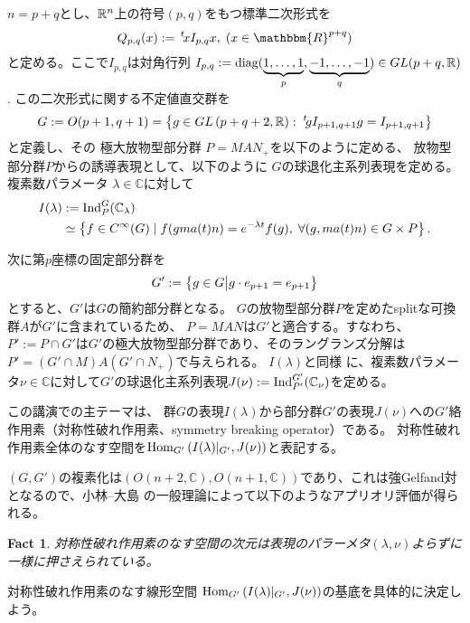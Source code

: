 \documentclass[12pt]{article} %
\newcommand{\assign}{:=}
\newcommand{\tmop}[1]{\ensuremath{\operatorname{#1}}}
\newcommand{\Hom}{\mbox{\normalfont Hom}}
\newcommand{\Ind}{\mbox{\normalfont Ind}}
\newtheorem{fact}[theorem]{Fact}
\theoremstyle{definition}
\theoremstyle{exampstyle} \newtheorem{examp}[theorem]{Theorem}
\renewcommand{\Q}{Q_{p,q}}
\newcommand{\IlambdaGprime}{I(\lambda)\kern-0.3em\mid_{G'}}
\newcommand{\SBO}{\Hom_{G'}\left(\IlambdaGprime,J(\nu) \right)}
\begin{document}
  \begin{versiona}
	  $n=p+q$と{し}、$\mathbb{R}^n$上の符号$(p,q)$をもつ標準二次形式を
	  \begin{equation*}
  \Q (x) \assign \,^t \! x I_{p, q} x, \; (x \in
  \mathbbm{R}^{p + q})
	  \end{equation*}
	  と定める。ここで$I_{p,q}$は対角行列
   $I_{p, q} \assign \tmop{diag} (\underbrace{1, \ldots, 1}_p, \underbrace{-
  1, \ldots, - 1}_q)\in GL(p+q,\R)$.
この二次形式に{関する}不定値直交群を
\begin{equation*}
	G \assign O (p +
1, q + 1)=\left\{ g\in GL\left( p+q+2,\R \right):\;^t\!gI_{p+1,q+1}g=I_{p+1,q+1} \right\}
\end{equation*}
と定義し、その
極大放物型部分群
$P=MAN_{+}$を以下のように定める、
放物型部分群$P$からの誘導表現として、以下のように
$G$の球退化主系列表現を定める。
複素数パラメータ
\renewcommand{\C}{\mathbb{C}}
$\lambda\in\C$に対して
\begin{align*}
I(\lambda)&:=\Ind_P^G(\C_\lambda)\\
&\simeq \left\{ f\in C^{\infty}(G)\mid f(gma(t)n)=e^{-\lambda t}f(g),\;\forall(g,ma(t)n)\in G\times P \right\}.
\end{align*}

次に第$p$座標の固定部分群を
\begin{equation*}
	G':=\left\{g \in G\big| g \cdot e_{p + 1} = e_{p + 1}\right\}
\end{equation*}
とすると、$G'$は$G$の簡約部分群となる。
$G$の放物型部分群$P$を定めたsplitな可換群$A$が$G'$に含まれているため、
$P=MAN$は$G'$と適合する。すなわち、$P':=P\cap G'$は$G'$の極大放物型部分群であり、そのラングランズ分解は
$P'=(G'\cap M)A(G'\cap N_+)$で与えられ{る}。
$I(\lambda)$と同様
に、複素数パラメータ$\nu\in\C$に対して$G'$の球退化主系列表現$J(\nu):=\Ind_{P'}^{G'}(\C_{\nu})$を定める。

この講演での主テーマは{、}
群$G$の表現$I(\lambda)$から部分群$G'$の表現$J(\nu)$への$G'$絡作用素（対称性破れ作用素、symmetry breaking operator）である。
対称性破れ作用素全体のなす空間を$\SBO$と表記す{る}。

$(G,G')$の複素化は$(O(n+2,\C),O(n+1,\C))$であり、これは強Gelfand対となるので、小林--大島
\cite{kobayashi2013finite}の一般理論によって以下のようなアプリオリ評価が得られる。
\begin{fact}
	対称性破れ作用素のなす空間の次元は表現のパラーメタ$(\lambda,\nu)$よらずに一様に押さえられている。
\end{fact}
対称性破れ作用素のなす線形空間
$\SBO$の基底を具体的に決定しよう。


\end{versiona}
\end{document}
